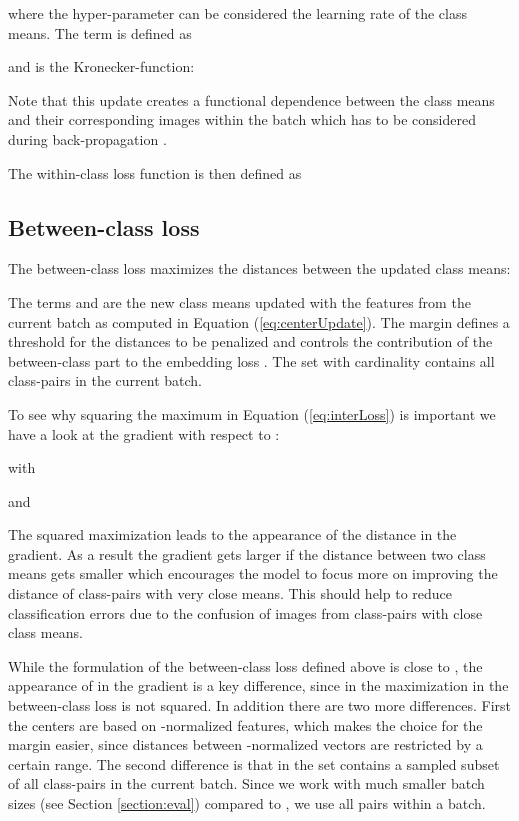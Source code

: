\documentclass[10pt,twocolumn,letterpaper]{article}
\begin{document}
where the hyper-parameter  can be considered the learning rate of the class means. The term  is defined as

and  is the Kronecker-function:

Note that this update creates a functional dependence between the class means and their corresponding images within the batch which has to be considered during back-propagation \cite{hanselmann2017deep}.

The within-class loss function is then defined as



\subsection{Between-class loss}
\label{section:interLoss}
The between-class loss maximizes the distances between the updated class means:

The terms  and  are the new class means updated with the features  from the current batch as computed in Equation (\ref{eq:centerUpdate}). The margin  defines a threshold for the distances to be penalized and  controls the contribution of the between-class part to the embedding loss . The set  with cardinality  contains all class-pairs in the current batch. 

To see why squaring the maximum in Equation (\ref{eq:interLoss}) is important we have a look at the gradient with respect to :


with

and

The squared maximization leads to the appearance of the distance  in the gradient. As a result the gradient gets larger if the distance between two class means gets smaller which encourages the model to focus more on improving the distance of class-pairs with very close means. This should help to reduce classification errors due to the confusion of images from class-pairs with close class means.

While the formulation of the between-class loss defined above is close to \cite{hanselmann2017deep}, the appearance of  in the gradient is a key difference, since in \cite{hanselmann2017deep} the maximization in the between-class loss is not squared. In addition there are two more differences. First the centers are based on -normalized features, which makes the choice for the margin  easier, since distances between -normalized vectors are restricted by a certain range. 
The second difference is that in \cite{hanselmann2017deep} the set  contains a sampled subset of all class-pairs in the current batch. Since we work with much smaller batch sizes (see Section \ref{section:eval}) compared to \cite{hanselmann2017deep}, we use all pairs within a batch.
\end{document}
